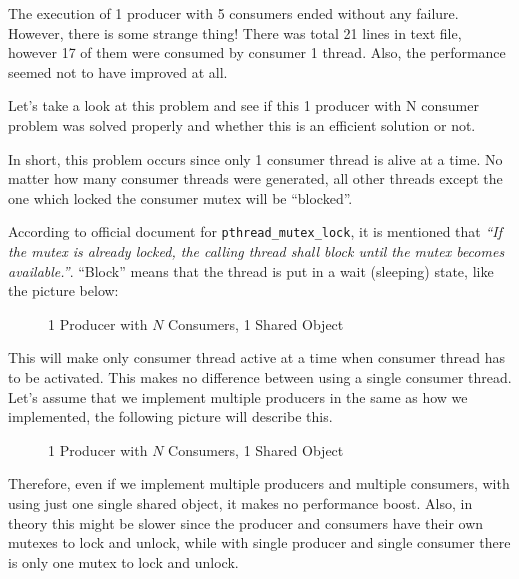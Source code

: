 \documentclass{homework}
\begin{document}
The execution of 1 producer with 5 consumers ended without any failure. However, there is some strange thing! There was total 21 lines in text file, however 17 of them were consumed by consumer 1 thread. Also, the performance seemed not to have improved at all.
\par

Let’s take a look at this problem and see if this 1 producer with N consumer problem was solved properly and whether this is an efficient solution or not.
\par

In short, this problem occurs since only 1 consumer thread is alive at a time. No matter how many consumer threads were generated, all other threads except the one which locked the consumer mutex will be “blocked”. 
\par

According to official document for \texttt{pthread_mutex_lock}, it is mentioned that \textit{“If the mutex is already locked, the calling thread shall block until the mutex becomes available.”}. “Block” means that the thread is put in a wait (sleeping) state, like the picture below:
\par

\begin{figure}[h]
  \centering
  
  \caption{1 Producer with $N$ Consumers, 1 Shared Object}
\end{figure}

This will make only consumer thread active at a time when consumer thread has to be activated. This makes no difference between using a single consumer thread. Let’s assume that we implement multiple producers in the same as how we implemented, the following picture will describe this.
\par

\begin{figure}[h]
  \centering
  
  \caption{1 Producer with $N$ Consumers, 1 Shared Object}
\end{figure}

Therefore, even if we implement multiple producers and multiple consumers, with using just one single shared object, it makes no performance boost. Also, in theory this might be slower since the producer and consumers have their own mutexes to lock and unlock, while with single producer and single consumer there is only one mutex to lock and unlock.
\par
\end{document}
